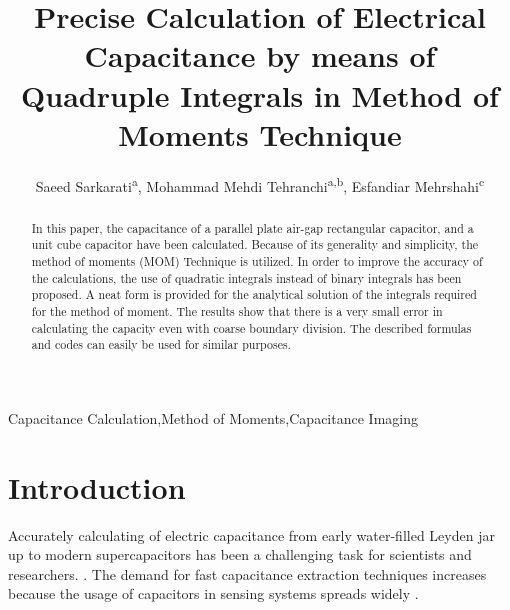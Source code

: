 \documentclass[final,5p,times,twocolumn]{elsarticle}
\begin{document}
\begin{frontmatter}

\title{Precise Calculation of Electrical Capacitance by means of Quadruple Integrals in  Method of Moments Technique}


\author{Saeed Sarkarati\textsuperscript{a}, Mohammad Mehdi Tehranchi\textsuperscript{a,b}, Esfandiar Mehrshahi\textsuperscript{c}}
\address{\textsuperscript{a}Laser and Plasma Research Institute, Shahid Beheshti University, Tehran, Iran}
\address{\textsuperscript{b}Department of Physics , Shahid Beheshti University, Tehran, Iran}
\address{\textsuperscript{c}Department of Electrical Engineering, Shahid Beheshti University, Tehran, Iran}



\begin{abstract}
In this paper, the capacitance of a parallel plate air-gap rectangular capacitor, and a unit cube capacitor have been calculated. Because of its generality and simplicity, the method of moments (MOM) Technique is utilized. In order to improve the accuracy of the calculations, the use of quadratic integrals instead of binary integrals has been proposed. A neat form is provided for the analytical solution of the integrals required for the method of moment. The results show that there is a very small error in calculating the capacity even with coarse boundary division. The described formulas and codes can easily be used for similar purposes.

\end{abstract}

\begin{keyword}
Capacitance Calculation\sep Method of Moments\sep Capacitance Imaging

\end{keyword}

\end{frontmatter}

\linenumbers

\section{Introduction}

Accurately calculating of electric capacitance from early water-filled Leyden jar up to modern supercapacitors has been a challenging task for scientists and researchers. \cite{Dubal2016}. The demand for fast capacitance extraction techniques increases because the usage of capacitors in sensing systems spreads widely \cite{Rahman2009}.
\end{document}
